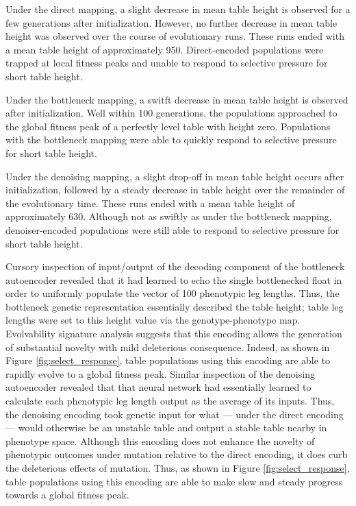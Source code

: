 Under the direct mapping, a slight decrease in mean table height is observed for a few generations after initialization.
However, no further decrease in mean table height was observed over the course of evolutionary runs.
These runs ended with a mean table height of approximately 950.
Direct-encoded populations were trapped at local fitness peaks and unable to respond to selective pressure for short table height.

Under the bottleneck mapping, a switft decrease in mean table height is observed after initialization.
Well within 100 generations, the populations approached to the global fitness peak of a perfectly level table with height zero.
Populations with the bottleneck mapping were able to quickly respond to selective pressure for short table height.

Under the denoising mapping, a slight drop-off in mean table height occurs after initialization, followed by a steady decrease in table height over the remainder of the evolutionary time.
These runs ended with a mean table height of approximately 630.
Although not as swiftly as under the bottleneck mapping, denoiser-encoded populations were still able to respond to selective pressure for short table height.

Cursory inspection of input/output of the decoding component of the bottleneck autoencoder revealed that it had learned to echo the single bottlenecked float in order to uniformly populate the vector of 100 phenotypic leg lengths.
Thus, the bottleneck genetic representation essentially described the table height; table leg lengths were set to this height value via the genotype-phenotype map.
Evolvability signature analysis suggests that this encoding allows the generation of substantial novelty with mild deleterious consequence.
Indeed, as shown in Figure \ref{fig:select_response}, table populations using this encoding are able to rapidly evolve to a global fitness peak.
Similar inspection of the denoising autoencoder revealed that that neural network had essentially learned to calculate each phenotypic leg length output as the average of its inputs.
Thus, the denoising encoding took genetic input for what --- under the direct encoding --- would otherwise be an unstable table and output a stable table nearby in phenotype space.
Although this encoding does not enhance the novelty of phenotypic outcomes under mutation relative to the direct encoding, it does curb the deleterious effects of mutation.
Thus, as shown in Figure \ref{fig:select_response}, table populations using this encoding are able to make slow and steady progress towards a global fitness peak.

